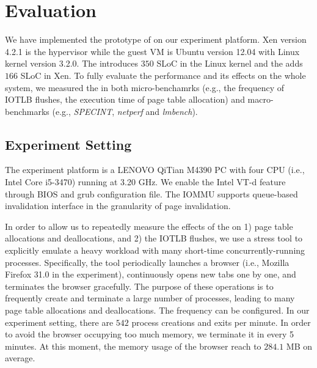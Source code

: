 \section{Evaluation} \label{sec:eva}
We have implemented the prototype of \name on our experiment platform.
Xen version 4.2.1 is the hypervisor while the guest VM is Ubuntu version 12.04 with Linux kernel version 3.2.0. 
The \cache introduces $350$ SLoC in the Linux kernel and the \module adds $166$ SLoC in Xen.
To fully evaluate the performance and its effects on the whole system, we measured the \name in both micro-benchamrks (e.g., the frequency of IOTLB flushes, the execution time of page table allocation) and macro-benchmarks (e.g., \emph{SPECINT}, \emph{netperf} and \emph{lmbench}).

\subsection{Experiment Setting}
The experiment platform is a LENOVO QiTian M4390 PC with four CPU (i.e., Intel Core i5-3470) running at 3.20 GHz. 
We enable the Intel VT-d feature through BIOS and grub configuration file. The IOMMU supports queue-based invalidation interface in the granularity of page invalidation. 


In order to allow us to repeatedly measure the effects of the \name on 1) page table allocations and deallocations, and 2) the IOTLB flushes, we use a stress tool to explicitly emulate a heavy workload with many short-time concurrently-running processes. 
Specifically, the tool periodically launches a browser (i.e., Mozilla Firefox 31.0 in the experiment), continuously opens new tabs one by one, and terminates the browser gracefully.
The purpose of these operations is to frequently create and terminate a large number of processes, leading to many page table allocations and deallocations.
The frequency can be configured. In our experiment setting, there are $542$ process creations and exits per minute.
In order to avoid the browser occupying too much memory, we terminate it in every 5 minutes.  
At this moment, the memory usage of the browser reach to $284.1$ MB on average.

